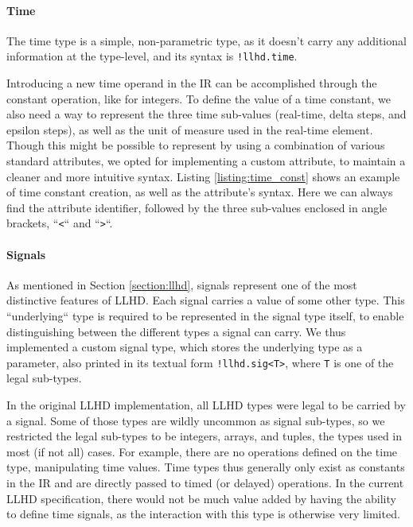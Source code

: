\paragraph{Time}
The time type is a simple, non-parametric type, as it doesn’t carry any additional information at the type-level, and its syntax is \texttt{!llhd.time}.

Introducing a new time operand in the IR can be accomplished through the constant operation, like for integers. To define the value of a time constant, we also need a way to represent the three time sub-values (real-time, delta steps, and epsilon steps), as well as the unit of measure used in the real-time element. Though this might be possible to represent by using a combination of various standard attributes, we opted for implementing a custom attribute, to maintain a cleaner and more intuitive syntax. Listing \ref{listing:time_const} shows an example of time constant creation, as well as the attribute's syntax. Here we can always find the attribute identifier, followed by the three sub-values enclosed in angle brackets, “\texttt{<}“ and “\texttt{>}“.


\paragraph{Signals}
As mentioned in Section \ref{section:llhd}, signals represent one of the most distinctive features of LLHD. Each signal carries a value of some other type. This “underlying“ type is required to be represented in the signal type itself, to enable distinguishing between the different types a signal can carry. We thus implemented a custom signal type, which stores the underlying type as a parameter, also printed in its textual form \texttt{!llhd.sig<T>}, where \texttt{T} is one of the legal sub-types.

In the original LLHD implementation, all LLHD types were legal to be carried by a signal. Some of those types are wildly uncommon as signal sub-types, so we restricted the legal sub-types to be integers, arrays, and tuples, the types used in most (if not all) cases. For example, there are no operations defined on the time type, manipulating time values. Time types thus generally only exist as constants in the IR and are directly passed to timed (or delayed) operations. In the current LLHD specification, there would not be much value added by having the ability to define time signals, as the interaction with this type is otherwise very limited.

